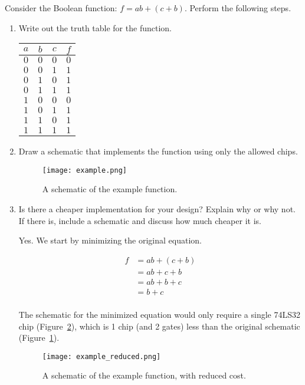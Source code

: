 \documentclass{article}
\begin{document}
Consider the Boolean function: $f = ab + (c + b)$.
Perform the following steps.

\begin{enumerate}

\item Write out the truth table for the function.

\begin{center}
\begin{tabular}{ccc|c}
$a$&$b$&$c$&$f$\\
\hline
$0$&$0$&$0$&$0$\\
$0$&$0$&$1$&$1$\\
$0$&$1$&$0$&$1$\\
$0$&$1$&$1$&$1$\\
$1$&$0$&$0$&$0$\\
$1$&$0$&$1$&$1$\\
$1$&$1$&$0$&$1$\\
$1$&$1$&$1$&$1$\\
\end{tabular}
\end{center}

\item Draw a schematic that implements the function using only the allowed chips.

\begin{figure}[h!]
    \centering
    \texttt{[image: example.png]}
    \caption{A schematic of the example function.}
    \label{f:example}
\end{figure}

\item Is there a cheaper implementation for your design?
    Explain why or why not.
    If there is, include a schematic and discuss how much cheaper it is.

Yes.
We start by minimizing the original equation.

\begin{align*}
    f   &= ab + (c + b)\\
        &= ab + c + b\\
        &= ab + b + c\\
        &= b + c \tag{Covering}\\
\end{align*}

The schematic for the minimized equation would only require a single 74LS32 chip (Figure~\ref{f:example_reduced}), which is 1 chip (and 2 gates) less than the original schematic (Figure~\ref{f:example}).

\begin{figure}[!ht]
    \centering
    \texttt{[image: example\_reduced.png]}
    \caption{A schematic of the example function, with reduced cost.}
    \label{f:example_reduced}
\end{figure}
\end{enumerate}
\end{document}
